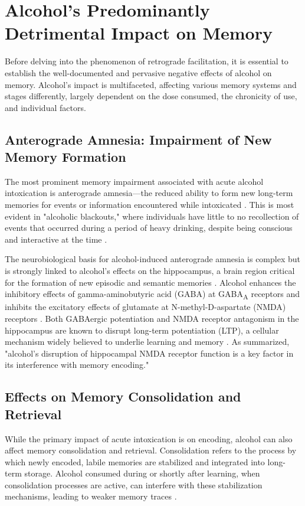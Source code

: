 \documentclass[12pt, a4paper]{article}
\begin{document}
\section{Alcohol's Predominantly Detrimental Impact on Memory}
Before delving into the phenomenon of retrograde facilitation, it is essential to establish the well-documented and pervasive negative effects of alcohol on memory. Alcohol's impact is multifaceted, affecting various memory systems and stages differently, largely dependent on the dose consumed, the chronicity of use, and individual factors.

\subsection{Anterograde Amnesia: Impairment of New Memory Formation}
The most prominent memory impairment associated with acute alcohol intoxication is anterograde amnesia—the reduced ability to form new long-term memories for events or information encountered while intoxicated \cite{Goodwin1973}. This is most evident in "alcoholic blackouts," where individuals have little to no recollection of events that occurred during a period of heavy drinking, despite being conscious and interactive at the time \cite{White2004}.

The neurobiological basis for alcohol-induced anterograde amnesia is complex but is strongly linked to alcohol's effects on the hippocampus, a brain region critical for the formation of new episodic and semantic memories \cite{Ryback1971}. Alcohol enhances the inhibitory effects of gamma-aminobutyric acid (GABA) at GABA\textsubscript{A} receptors and inhibits the excitatory effects of glutamate at N-methyl-D-aspartate (NMDA) receptors \cite{Lovinger1997}. Both GABAergic potentiation and NMDA receptor antagonism in the hippocampus are known to disrupt long-term potentiation (LTP), a cellular mechanism widely believed to underlie learning and memory \cite{Bliss1993}. As \cite{Zorumski2014} summarized, "alcohol’s disruption of hippocampal NMDA receptor function is a key factor in its interference with memory encoding."

\subsection{Effects on Memory Consolidation and Retrieval}
While the primary impact of acute intoxication is on encoding, alcohol can also affect memory consolidation and retrieval. Consolidation refers to the process by which newly encoded, labile memories are stabilized and integrated into long-term storage. Alcohol consumed during or shortly after learning, when consolidation processes are active, can interfere with these stabilization mechanisms, leading to weaker memory traces \cite{Weingartner1978}.
\end{document}
